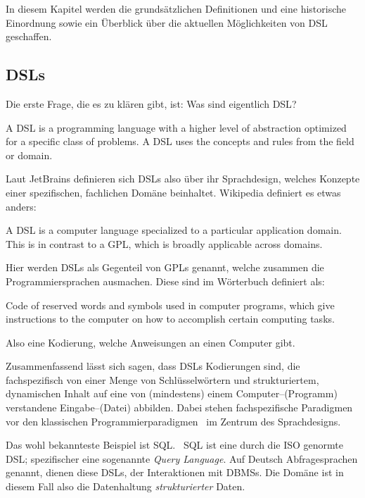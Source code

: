 In diesem Kapitel werden die grundsätzlichen Definitionen und eine historische Einordnung sowie ein Überblick über die aktuellen Möglichkeiten von \ac{DSL} geschaffen.

\subsection{\aclp{DSL}}\label{subsec:domain-specific-languages}
Die erste Frage, die es zu klären gibt, ist: Was sind eigentlich \ac{DSL}?
\begin{displayquote}
    A \ac{DSL} is a programming language with a higher level of abstraction optimized for a specific class of problems.
    A \ac{DSL} uses the concepts and rules from the field or domain.
\end{displayquote}
Laut JetBrains definieren sich \acp{DSL} also über ihr Sprachdesign, welches Konzepte einer spezifischen, fachlichen Domäne beinhaltet.
Wikipedia definiert es etwas anders:
\begin{displayquote}
    A \ac{DSL} is a computer language specialized to a particular application domain.
    This is in contrast to a \ac{GPL}, which is broadly applicable across domains.
\end{displayquote}
Hier werden \acp{DSL} als Gegenteil von \acp{GPL} genannt, welche zusammen die Programmiersprachen ausmachen.
Diese sind im Wörterbuch definiert als:
\begin{displayquote}
    Code of reserved words and symbols used in computer programs, which give instructions to the computer on how to accomplish certain computing tasks.
\end{displayquote}
Also eine Kodierung, welche Anweisungen an einen Computer gibt.

Zusammenfassend lässt sich sagen, dass \acp{DSL} Kodierungen sind, die fachspezifisch von einer Menge von Schlüsselwörtern und strukturiertem, dynamischen Inhalt auf eine von (mindestens) einem Computer--(Programm) verstandene Eingabe--(Datei) abbilden.
Dabei stehen fachspezifische Paradigmen vor den klassischen Programmierparadigmen~\autocite{martin-2018} im Zentrum des Sprachdesigns.

Das wohl bekannteste Beispiel ist \ac{SQL}.~\autocite{unknown-author-2023}
\ac{SQL} ist eine durch die \ac{ISO} genormte \ac{DSL}; spezifischer eine sogenannte \textit{Query Language}.
Auf Deutsch Abfragesprachen genannt, dienen diese \acp{DSL}, der Interaktionen mit \acp{DBMS}.
Die Domäne ist in diesem Fall also die Datenhaltung \textit{strukturierter} Daten.

